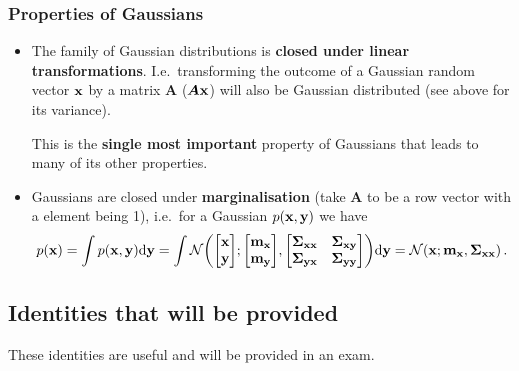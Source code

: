 \documentclass[a4paper]{article}
\newcommand{\mat}[1]{{\boldsymbol{{#1}}}} %
\newcommand{\mx}{\vm_\vx}
\newcommand{\my}{\vm_\vy}
\newcommand{\covx}{\boldsymbol{\Sigma}_{\vx\vx}}
\newcommand{\covy}{\boldsymbol{\Sigma}_{\vy\vy}}
\newcommand{\covxy}{\boldsymbol{\Sigma}_{\vx\vy}}
\newcommand{\covyx}{\boldsymbol{\Sigma}_{\vy\vx}}
\theoremstyle{definition}
\begin{document}
\subsubsection{Properties of Gaussians}
\begin{itemize}
  \item The family of Gaussian distributions is \textbf{closed under linear transformations}. I.e.~transforming the outcome of a Gaussian random vector $\mathbf{x}$ by a matrix $\mat A$ ($\mat A\vx$) will also be Gaussian distributed (see above for its variance).

This is the \textbf{single most important} property of Gaussians that leads to many of its other properties.
  \item Gaussians are closed under \textbf{marginalisation} (take $\mat A$ to be a row vector with a element being 1), i.e.~for a Gaussian $\p{\vx, \vy}$ we have
    \begin{align}
      p(\vx) = \int p(\vx, \vy) \calcd{\vy} = \int \NormDist{\begin{bmatrix}\vx \\ \vy\end{bmatrix}; \begin{bmatrix}\mx \\ \my\end{bmatrix}, \begin{bmatrix} \covx & \covxy \\ \covyx & \covy\end{bmatrix}} \calcd{\vy} = \NormDist{\vx; \mx, \covx} \,.
    \end{align}
\end{itemize}


\subsection{Identities that will be provided}
These identities are useful and will be provided in an exam.
\end{document}
